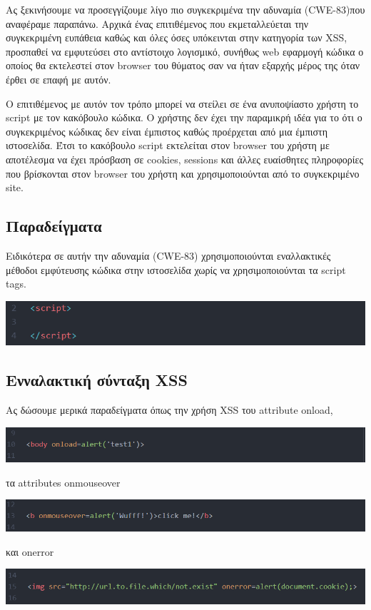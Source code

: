 \noindent
Ας ξεκινήσουμε να προσεγγίζουμε λίγο πιο συγκεκριμένα την αδυναμία (CWE-83)που αναφέραμε παραπάνω.  Αρχικά ένας επιτιθέμενος που εκμεταλλεύεται την συγκεκριμένη ευπάθεια καθώς και όλες όσες υπόκεινται στην κατηγορία των XSS, προσπαθεί να εμφυτεύσει στο αντίστοιχο λογισμικό, συνήθως web εφαρμογή κώδικα ο οποίος θα εκτελεστεί στον browser του θύματος σαν να ήταν εξαρχής μέρος της όταν έρθει σε επαφή με αυτόν. 

\noindent
Ο επιτιθέμενος με αυτόν τον τρόπο μπορεί να στείλει σε ένα ανυποψίαστο χρήστη το script με τον κακόβουλο κώδικα. Ο χρήστης δεν έχει την παραμικρή ιδέα για το ότι ο συγκεκριμένος κώδικας δεν είναι έμπιστος καθώς προέρχεται από μια έμπιστη ιστοσελίδα. Έτσι το κακόβουλο script εκτελείται στον browser του χρήστη με αποτέλεσμα να έχει πρόσβαση σε cookies, sessions και άλλες ευαίσθητες πληροφορίες που βρίσκονται στον browser του χρήστη και χρησιμοποιούνται από το συγκεκριμένο site.

\subsection{Παραδείγματα}
\noindent
Ειδικότερα σε αυτήν την αδυναμία (CWE-83) χρησιμοποιούνται εναλλακτικές μέθοδοι εμφύτευσης κώδικα στην ιστοσελίδα χωρίς να χρησιμοποιούνται τα script tags.
\begin{center}
			\includegraphics[width=1\textwidth]{image/1 script tags.PNG}		
\end{center}

\subsection{Ενναλακτική σύνταξη XSS}
\noindent
Ας δώσουμε μερικά παραδείγματα όπως την χρήση XSS του attribute onload,
\begin{center}
			\includegraphics[width=1\textwidth]{image/2.PNG}		
\end{center}

\noindent
τα attributes onmouseover
\begin{center}
			\includegraphics[width=1\textwidth]{image/3.PNG}		
\end{center}
\noindent
και onerror
\begin{center}
			\includegraphics[width=1\textwidth]{image/4.PNG}		
\end{center}
